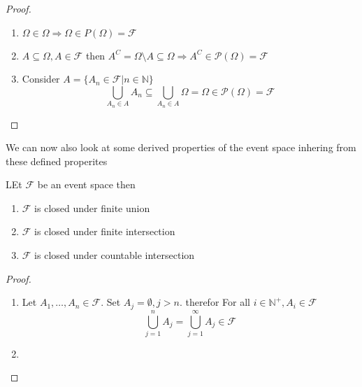 \documentclass{article}
\begin{document}
\begin{proof}
    \begin{enumerate}
        \item $\Omega \in \Omega \Rightarrow\Omega \in P(\Omega) = \mathcal{F}$
        \item $A \subseteq \Omega,A \in \mathcal{F}$ then $A^C = \Omega\text{\textbackslash}A \subseteq \Omega \Rightarrow A^C \in \mathcal{P}(\Omega) = \mathcal{F}$
        \item Consider $A = \{A_n \in \mathcal{F}| n \in \mathbb{N}\}$
        \[\bigcup_{A_n \in A}A_n \subseteq \bigcup_{A_n \in A}\Omega = \Omega \in \mathcal{P}(\Omega) = \mathcal{F} \]
    \end{enumerate}
\end{proof}
We can now also look at some derived properties of the event space inhering from these defined properites
\begin{proposition}
    LEt $\mathcal{F}$ be an event space then
    \begin{enumerate}
        \item $\mathcal{F}$ is closed under finite union
        \item $\mathcal{F}$ is closed under finite intersection
        \item $\mathcal{F}$ is closed under countable intersection
    \end{enumerate}
\end{proposition}
\begin{proof}
    \begin{enumerate}
        \item Let $A_1,\dots,A_n \in \mathcal{F}$. Set $A_j = \emptyset,j > n$. therefor For all $i \in \mathbb{N^+},A_i \in \mathcal{F}$
        \[\bigcup_{j=1}^nA_j = \bigcup_{j=1}^\infty A_j \in \mathcal{F}\]
        \item 
    \end{enumerate}
\end{proof}
\end{document}
